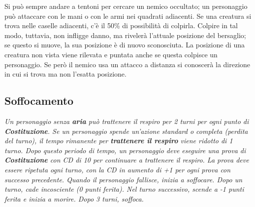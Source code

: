 {			Si può sempre andare a tentoni per cercare un nemico occultato; un personaggio può attaccare con le mani o con le armi nei quadrati adiacenti. Se una creatura si trova nelle caselle adiacenti, c'è il 50\% di possibilità di colpirla. Colpire in tal modo, tuttavia, non infligge danno, ma rivelerà l'attuale posizione del bersaglio; se questo si muove, la sua posizione è di nuovo sconosciuta. La posizione di una creatura non vista viene rilevata e puntata anche se questa colpisce un personaggio. Se però il nemico usa un attacco a distanza si conoscerà la direzione in cui si trova ma non l'esatta posizione.}
	
		\subsection{Soffocamento}
			\emph{Un personaggio senza \textbf{aria} può trattenere il respiro per 2 turni per ogni punto di \textbf{Costituzione}. Se un personaggio spende un'azione standard o completa (perdita del turno), il tempo rimanente per \textbf{trattenere il respiro} viene ridotto di 1 turno. Dopo questo periodo di tempo, un personaggio deve eseguire una prova di \textbf{Costituzione} con CD di 10 per continuare a trattenere il respiro. La prova deve essere ripetuta ogni turno, con la CD in aumento di +1 per ogni prova con successo precedente. Quando il personaggio fallisce, inizia a soffocare. Dopo un turno, cade incosciente (0 punti ferita). Nel turno successivo, scende a -1 punti ferita e inizia a morire. Dopo 3 turni, soffoca.}
			
